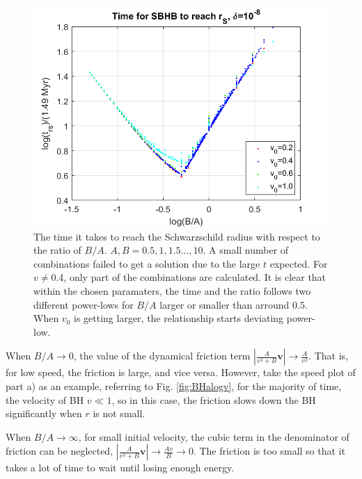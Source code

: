 \documentclass[12pt, graphicx]{article}
\begin{document}
\begin{figure}[ht]
\centering
\includegraphics[width = 120mm]{trs_log.png}
\caption{The time it takes to reach the Schwarzschild radius with respect to the ratio of $B/A$. $A, B=0.5, 1, 1.5..., 10$. A small number of combinations failed to get a solution due to the large $t$ expected. For $v\neq0.4$, only part of the combinations are calculated. It is clear that within the chosen paramaters, the time and the ratio follows two different power-lows for $B/A$ larger or smaller than arround 0.5. When $v_0$ is getting larger, the relationship starts deviating power-low.}
\label{fig:BHclog}
\end{figure}

When $B/A\to 0$, the value of the dynamical friction term $|\frac{A}{v^3+B}\mathbf{v}|\to\frac{A}{v^2}$. That is, for low speed, the friction is large, and vice versa. However, take the speed plot of part a) as an example, referring to Fig. \ref{fig:BHalogv}, for the majority of time, the velocity of BH $v\ll 1$, so in this case, the friction slows down the BH significantly when $r$ is not small. \par
When $B/A\to\infty$, for small initial velocity, the cubic term in the denominator of friction can be neglected,  $|\frac{A}{v^3+B}\mathbf{v}|\to\frac{Av}{B}\to 0$. The friction is too small so that it takes a lot of time to wait until losing enough energy. 

\clearpage
\end{document}
